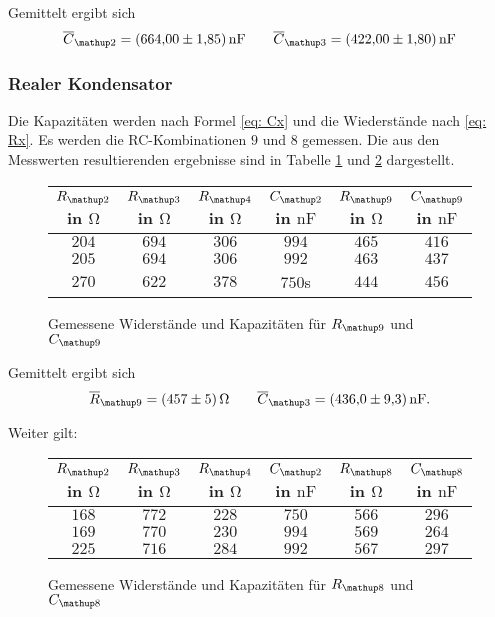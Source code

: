 Gemittelt ergibt sich
\begin{equation}
\label{eq:wert_c12_c_13}
\overline{C}_{\map{2}}=\SI{664\pm1.85}{\nano\farad} \qquad \overline{C}_{\map{3}}=\SI{422\pm1.80}{\nano\farad}
\end{equation}

\subsubsection{Realer Kondensator}

Die Kapazitäten werden nach Formel \eqref{eq: Cx} und die 
Wiederstände nach \eqref{eq: Rx}.
Es werden die RC-Kombinationen $9$ und $8$ gemessen.
Die aus den Messwerten resultierenden ergebnisse sind in Tabelle 
\ref{tab:rc_r9} und \ref{tab:rc_r8} dargestellt.

\begin{figure}
\centering
\caption{Gemessene Widerstände und Kapazitäten für $R\ua{9}$ und $C\ua{9}$}
  \label{tab:rc_r9}
\begin{tabular}{S S S S S S }
    \toprule
    {$R\ua{2}$ in $\si{\ohm}$} &  {$R\ua{3}$ in $\si{\ohm}$} & {$R\ua{4}$ in $\si{\ohm}$} & {$C\ua{2}$ in $\si{\nano\farad}$}& {$R\ua{9}$ in $\si{\ohm}$} &  {$C\ua{9}$ in $\si{\nano\farad}$} \\
    \midrule
     {$\num{204}$} & {$\num{694}$} &  {$\num{306}$}& {$\num{994}$}  &  {$\num{465}$} & {$\num{416}$}\\
     {$\num{205}$} & {$\num{694}$}  & {$\num{306}$} & {$\num{992}$} & {$\num{463}$} & {$\num{437}$}\\
     {$\num{270}$} & {$\num{622}$}  & {$\num{378}$} & {$\num{750}$s} &{$\num{444}$} & {$\num{456}$}  \\
 
     \bottomrule
  \end{tabular}
 \end{figure}
Gemittelt ergibt sich
\begin{equation}
\label{eq:wert_r9_c_9}
\overline{R}_{\map{9}}=\SI{457\pm5}{\ohm} \qquad \overline{C}_{\map{3}}=\SI{436\pm9.3}{\nano\farad}.
\end{equation}

Weiter gilt:

\begin{figure}
\centering
\caption{Gemessene Widerstände und Kapazitäten für $R\ua{8}$ und $C\ua{8}$}
  \label{tab:rc_r8}
  \begin{tabular}{S S S S S S}
  \toprule
    {$R\ua{2}$ in $\si{\ohm}$} &  {$R\ua{3}$ in $\si{\ohm}$} & {$R\ua{4}$ in $\si{\ohm}$} & {$C\ua{2}$ in $\si{\nano\farad}$}& {$R\ua{8}$ in $\si{\ohm}$} &  {$C\ua{8}$ in $\si{\nano\farad}$} \\
    \midrule
    {$\num{168}$} & {$\num{772}$} &  {$\num{228}$}& {$\num{750}$}  &  {$\num{566}$} & {$\num{296}$}\\
     {$\num{169}$} & {$\num{770}$}  & {$\num{230}$} & {$\num{994}$} & {$\num{569}$} & {$\num{264}$}\\
     {$\num{225}$} & {$\num{716}$}  & {$\num{284}$} & {$\num{992}$} &{$\num{567}$} & {$\num{297}$}  \\
     \bottomrule
    \end{tabular}
\end{figure}

